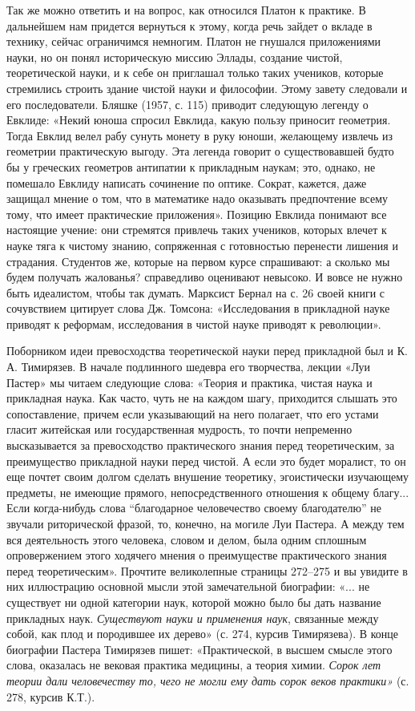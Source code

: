 Так же можно ответить и на  вопрос, как относился Платон к практике. В
дальнейшем  нам  придется  вернуться  к этому,  когда  речь  зайдет  о
вкладе  в технику,  сейчас  ограничимся немногим.  Платон не  гнушался
приложениями науки,  но он понял историческую  миссию Эллады, создание
чистой,  теоретической  науки, и  к  себе  он приглашал  только  таких
учеников, которые стремились строить  здание чистой науки и философии.
Этому  завету следовали  и его  последователи. Бляшке  (1957, с.  115)
приводит следующую  легенду о  Евклиде: «Некий юноша  спросил Евклида,
какую пользу приносит геометрия. Тогда Евклид велел рабу сунуть монету
в руку юноши, желающему извлечь  из геометрии практическую выгоду. Эта
легенда  говорит  о  существовавшей  будто бы  у  греческих  геометров
антипатии  к  прикладным  наукам;  это, однако,  не  помешало  Евклиду
написать сочинение по  оптике. Сократ, кажется, даже  защищал мнение о
том,  что в  математике надо  оказывать предпочтение  всему тому,  что
имеет практические приложения». Позицию Евклида понимают все настоящие
учение: они стремятся привлечь таких  учеников, которых влечет к науке
тяга к чистому  знанию, сопряженная с готовностью  перенести лишения и
страдания. Студентов же, которые на первом курсе спрашивают: а сколько
мы будем  получать жалованья? справедливо оценивают  невысоко. И вовсе
не нужно быть  идеалистом, чтобы так думать. Марксист Бернал  на с. 26
своей книги с сочувствием цитирует  слова Дж. Томсона: «Исследования в
прикладной  науке приводят  к  реформам, исследования  в чистой  науке
приводят к революции».

Поборником идеи превосходства теоретической науки перед прикладной был
и К. А. Тимирязев. В  начале подлинного шедевра его творчества, лекции
«Луи Пастер»  мы читаем  следующие слова:  «Теория и  практика, чистая
наука  и  прикладная  наука.  Как  часто,  чуть  не  на  каждом  шагу,
приходится  слышать  это  сопоставление, причем  если  указывающий  на
него  полагает, что  его устами  гласит житейская  или государственная
мудрость,   то  почти   непременно   высказывается  за   превосходство
практического знания  перед теоретическим, за  преимущество прикладной
науки перед чистой. А если это  будет моралист, то он еще почтет своим
долгом сделать  внушение теоретику, эгоистически  изучающему предметы,
не имеющие прямого, непосредственного отношения к общему благу... Если
когда-нибудь слова ``благодарное  человечество своему благодателю'' не
звучали риторической  фразой, то,  конечно, на  могиле Луи  Пастера. А
между  тем  вся деятельность  этого  человека,  словом и  делом,  была
одним  сплошным опровержением  этого  ходячего  мнения о  преимуществе
практического  знания  перед   теоретическим».  Прочтите  великолепные
страницы 272--275 и  вы увидите в них иллюстрацию  основной мысли этой
замечательной биографии:  «... не существует ни  одной категории наук,
которой можно было бы  дать название прикладных наук. \emph{Существуют
науки и применения наук}, связанные между собой, как плод и породившее
их  дерево» (с.  274, курсив  Тимирязева). В  конце биографии  Пастера
Тимирязев пишет: «Практической, в высшем смысле этого слова, оказалась
не вековая практика  медицины, а теория химии.  \emph{Сорок лет теории
дали человечеству  то, чего не  могли ему дать сорок  веков практики»}
(с. 278, курсив К.Т.).

